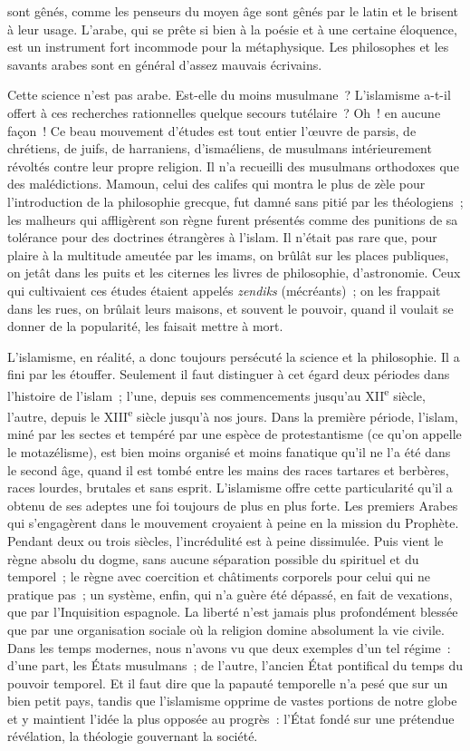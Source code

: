 \documentclass[french,twoside]{book} %
\newcommand\persName[1]{#1}
\begin{document}
sont gênés, comme les penseurs du moyen âge sont gênés par le latin et le brisent à leur usage. L’arabe, qui se prête si bien à la poésie et à une certaine éloquence, est un instrument fort incommode pour la métaphysique. Les philosophes et les savants arabes sont en général d’assez mauvais écrivains.\par
Cette science n’est pas arabe. Est-elle du moins musulmane ? L’islamisme a-t-il offert à ces recherches rationnelles quelque secours tutélaire ? Oh ! en aucune façon ! Ce beau mouvement d’études est tout entier l’œuvre de parsis, de chrétiens, de juifs, de harraniens, d’ismaéliens, de musulmans intérieurement révoltés contre leur propre religion. Il n’a recueilli des musulmans orthodoxes que des malédictions. {\persName Mamoun}, celui des califes qui montra le plus de zèle pour l’introduction de la philosophie grecque, fut damné sans pitié par les théologiens ; les malheurs qui affligèrent son règne furent présentés comme des punitions de sa tolérance pour des doctrines étrangères à l’islam. Il n’était pas rare que, pour plaire à la multitude ameutée par les imams, on brûlât sur les places publiques, on jetât dans les puits et les citernes les livres de philosophie, d’astronomie. Ceux qui cultivaient ces études étaient appelés {\itshape zendiks} (mécréants) ; on les frappait dans les rues, on brûlait leurs maisons, et souvent le pouvoir, quand il voulait se donner de la popularité, les faisait mettre à mort.\par
L’islamisme, en réalité, a donc toujours persécuté la science et la philosophie. Il a fini par les étouffer. Seulement il faut distinguer à cet égard deux périodes dans l’histoire de l’islam ; l’une, depuis ses commencements jusqu’au XII\textsuperscript{e} siècle, l’autre, depuis le XIII\textsuperscript{e} siècle jusqu’à nos jours. Dans la première période, l’islam, miné par les sectes et tempéré par une espèce de protestantisme (ce qu’on appelle le motazélisme), est bien moins organisé et moins fanatique qu’il ne l’a été dans le second âge, quand il est tombé entre les mains des races tartares et berbères, races lourdes, brutales et sans esprit. L’islamisme offre cette particularité qu’il a obtenu de ses adeptes une foi toujours de plus en plus forte. Les premiers Arabes qui s’engagèrent dans le mouvement croyaient à peine en la mission du {\persName Prophète}. Pendant deux ou trois siècles, l’incrédulité est à peine dissimulée. Puis vient le règne absolu du dogme, sans aucune séparation possible du spirituel et du temporel ; le règne avec coercition et châtiments corporels pour celui qui ne pratique pas ; un système, enfin, qui n’a guère été dépassé, en fait de vexations, que par l’Inquisition espagnole. La liberté n’est jamais plus profondément blessée que par une organisation sociale où la religion domine absolument la vie civile. Dans les temps modernes, nous n’avons vu que deux exemples d’un tel régime : d’une part, les États musulmans ; de l’autre, l’ancien État pontifical du temps du pouvoir temporel. Et il faut dire que la papauté temporelle n’a pesé que sur un bien petit pays, tandis que l’islamisme opprime de vastes portions de notre globe et y maintient l’idée la plus opposée au progrès : l’État fondé sur une prétendue révélation, la théologie gouvernant la société.\par
\end{document}
